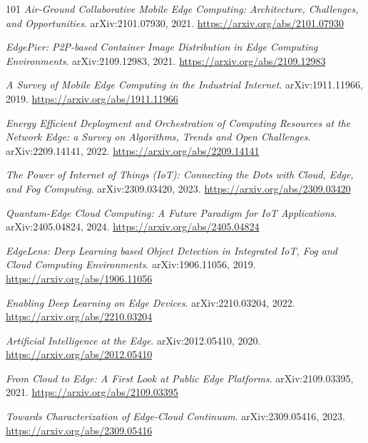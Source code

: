 \documentclass[11pt,a4paper]{article}
\begin{document}
\begin{thebibliography}{101}
\newblock \emph{Air-Ground Collaborative Mobile Edge Computing: Architecture, Challenges, and Opportunities}.
\newblock arXiv:2101.07930, 2021.
\newblock \url{https://arxiv.org/abs/2101.07930}

\newblock \emph{EdgePier: P2P-based Container Image Distribution in Edge Computing Environments}.
\newblock arXiv:2109.12983, 2021.
\newblock \url{https://arxiv.org/abs/2109.12983}

\newblock \emph{A Survey of Mobile Edge Computing in the Industrial Internet}.
\newblock arXiv:1911.11966, 2019.
\newblock \url{https://arxiv.org/abs/1911.11966}

\newblock \emph{Energy Efficient Deployment and Orchestration of Computing Resources at the Network Edge: a Survey on Algorithms, Trends and Open Challenges}.
\newblock arXiv:2209.14141, 2022.
\newblock \url{https://arxiv.org/abs/2209.14141}

\newblock \emph{The Power of Internet of Things (IoT): Connecting the Dots with Cloud, Edge, and Fog Computing}.
\newblock arXiv:2309.03420, 2023.
\newblock \url{https://arxiv.org/abs/2309.03420}

\newblock \emph{Quantum-Edge Cloud Computing: A Future Paradigm for IoT Applications}.
\newblock arXiv:2405.04824, 2024.
\newblock \url{https://arxiv.org/abs/2405.04824}

\newblock \emph{EdgeLens: Deep Learning based Object Detection in Integrated IoT, Fog and Cloud Computing Environments}.
\newblock arXiv:1906.11056, 2019.
\newblock \url{https://arxiv.org/abs/1906.11056}

\newblock \emph{Enabling Deep Learning on Edge Devices}.
\newblock arXiv:2210.03204, 2022.
\newblock \url{https://arxiv.org/abs/2210.03204}

\newblock \emph{Artificial Intelligence at the Edge}.
\newblock arXiv:2012.05410, 2020.
\newblock \url{https://arxiv.org/abs/2012.05410}

\newblock \emph{From Cloud to Edge: A First Look at Public Edge Platforms}.
\newblock arXiv:2109.03395, 2021.
\newblock \url{https://arxiv.org/abs/2109.03395}

\newblock \emph{Towards Characterization of Edge-Cloud Continuum}.
\newblock arXiv:2309.05416, 2023.
\newblock \url{https://arxiv.org/abs/2309.05416}


\end{thebibliography}
\end{document}
